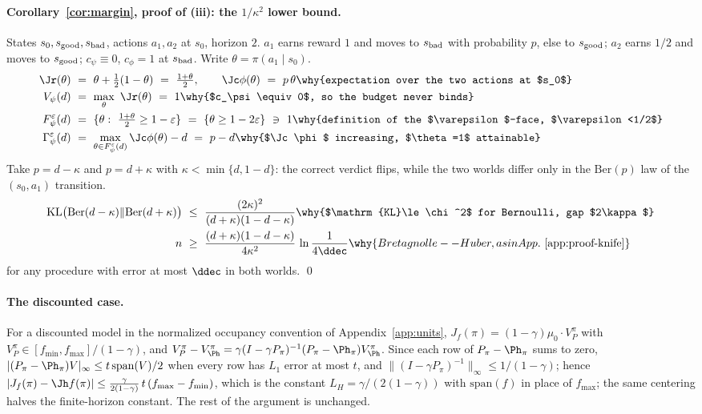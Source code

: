 \paragraph{Corollary~\ref{cor:margin}, proof of (iii): the $1/\kappa^2$ lower bound.} States
$s_0,s_{\rm good},s_{\rm bad}$, actions $a_1,a_2$ at $s_0$, horizon $2$.
$a_1$ earns reward $1$ and moves to $s_{\rm bad}$ with probability $p$, else
to $s_{\rm good}$; $a_2$ earns $1/2$ and moves to $s_{\rm good}$;
$c_\psi\equiv0$, $c_\phi=1$ at $s_{\rm bad}$. Write $\theta=\pi(a_1\mid s_0)$.
\begin{align*}
\Jr(\theta)\ &=\ \theta+\tfrac12(1-\theta)\ =\ \tfrac{1+\theta}{2},\qquad
   \Jc\phi(\theta)\ =\ p\,\theta
   \why{expectation over the two actions at $s_0$}\\
V_\psi(d)\ &=\ \max_\theta\ \Jr(\theta)\ =\ 1
   \why{$c_\psi\equiv0$, so the budget never binds}\\
F^\varepsilon_\psi(d)\ &=\ \{\theta:\ \tfrac{1+\theta}{2}\ge1-\varepsilon\}\ =\ \{\theta\ge1-2\varepsilon\}\ \ni\ 1
   \why{definition of the $\varepsilon$-face, $\varepsilon<1/2$}\\
\Gamma^\varepsilon_\psi(d)\ &=\ \max_{\theta\in F^\varepsilon_\psi(d)}\Jc\phi(\theta)-d\ =\ p-d
   \why{$\Jc\phi$ increasing, $\theta=1$ attainable}
\end{align*}
Take $p=d-\kappa$ and $p=d+\kappa$ with $\kappa<\min\{d,1-d\}$: the correct
verdict flips, while the two worlds differ only in the $\mathrm{Ber}(p)$ law
of the $(s_0,a_1)$ transition.
\begin{align*}
\mathrm{KL}\big(\mathrm{Ber}(d-\kappa)\Vert\mathrm{Ber}(d+\kappa)\big)\ &\le\ \frac{(2\kappa)^2}{(d+\kappa)(1-d-\kappa)}
   \why{$\mathrm{KL}\le\chi^2$ for Bernoulli, gap $2\kappa$}\\
n\ &\ge\ \frac{(d+\kappa)(1-d-\kappa)}{4\kappa^{2}}\,\ln\frac{1}{4\ddec}
   \why{Bretagnolle--Huber, as in App.~\ref{app:proof-knife}}
\end{align*}
for any procedure with error at most $\ddec$ in both worlds. \qed

\paragraph{The discounted case.} For a discounted model in the normalized
occupancy convention of Appendix~\ref{app:units}, $J_f(\pi)=(1-\gamma)\mu_0\cdot V^\pi_P$
with $V^\pi_P\in[f_{\min},f_{\max}]/(1-\gamma)$, and
$V^\pi_P-V^\pi_{\Ph}=\gamma(I-\gamma P_\pi)^{-1}(P_\pi-\Ph_\pi)V^\pi_{\Ph}$.
Since each row of $P_\pi-\Ph_\pi$ sums to zero,
$|(P_\pi-\Ph_\pi)V|_\infty\le t\,\mathrm{span}(V)/2$ when every row has $L_1$
error at most $t$, and $\|(I-\gamma P_\pi)^{-1}\|_\infty\le1/(1-\gamma)$;
hence $|J_f(\pi)-\Jh f(\pi)|\le\frac{\gamma}{2(1-\gamma)}\,t\,(f_{\max}-f_{\min})$,
which is the constant $L_H=\gamma/(2(1-\gamma))$ with $\mathrm{span}(f)$ in
place of $f_{\max}$; the same centering halves the finite-horizon constant.
The rest of the argument is unchanged.

